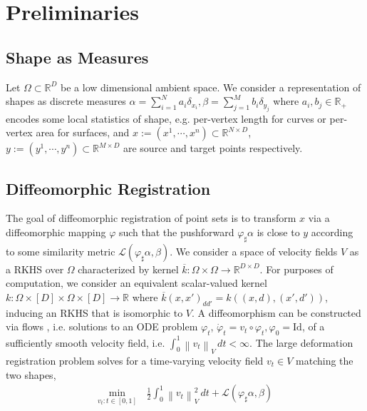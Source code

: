 \documentclass{6838publ}
\newcommand\sL{\ensuremath{\mathcal{L}}}
\newcommand\R{\ensuremath{\mathbb{R}}} %
\newcommand{\norm}[1]{\left\lVert#1\right\rVert}
\begin{document}


\section{Preliminaries}\label{sec:preliminaries}


\subsection{Shape as Measures}

Let $\Omega \subset\R^D$ be a low dimensional ambient space. We consider a representation of shapes as discrete measures $\alpha = \sum_{i=1}^N a_i \delta_{x_i}, \beta = \sum_{j=1}^M b_i \delta_{y_j}$ where $a_i,b_j\in\R_+$ encodes some local statistics of shape, e.g. per-vertex length for curves or per-vertex area for surfaces, and $x := (x^1,\cdots,x^n)\subset \R^{N\times D}$, $y := (y^1,\cdots,y^n)\subset\R^{M\times D}$ are source and target points respectively. 


\subsection{Diffeomorphic Registration}


The goal of diffeomorphic registration of point sets is to transform $x$ via a diffeomorphic mapping $\varphi$ such that the pushforward $\varphi_\sharp \alpha$ is close to $y$ according to some similarity metric $\sL(\varphi_\sharp \alpha, \beta)$. We consider a space of velocity fields $V$ as a RKHS over $\Omega$ characterized by kernel $\overline{k}:\Omega\times\Omega\to\R^{D\times D}$. For purposes of computation, we consider an equivalent scalar-valued kernel $k:\Omega\times[D]\times\Omega\times[D] \to\R$ where $\overline{k}(x,x')_{dd'} = k((x,d),(x',d'))$, inducing an RKHS that is isomorphic to $V$. A diffeomorphism can be constructed via flows , i.e. solutions to an ODE problem $\varphi_t$, $\dot{\varphi}_t = v_t\circ \varphi_t, \varphi_0 = \text{Id}$, of a sufficiently smooth velocity field, i.e. $\int_0^1 \norm{v_t}_V\, dt<\infty$. The large deformation registration problem solves for a time-varying velocity field $v_t\in V$ matching the two shapes,
\begin{align}
    \min_{v_t:t\in [0,1]} \,
        &\frac{1}{2} \int_0^1 \norm{v_t}_V^2 \, dt + \sL(\varphi_\sharp \alpha, \beta)
\end{align}
\end{document}

